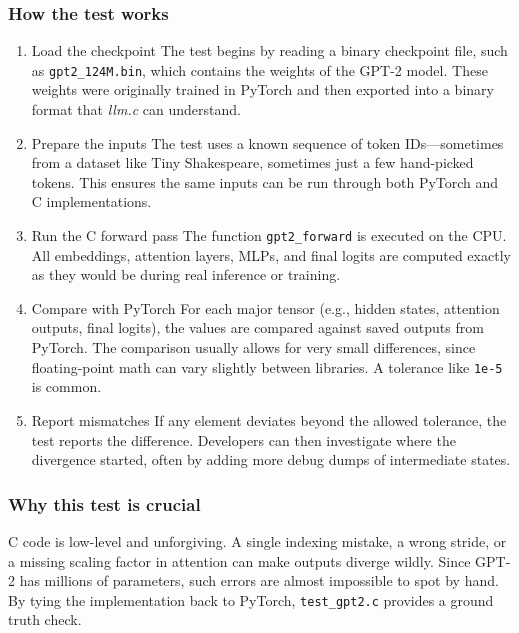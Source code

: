 \documentclass[
  letterpaper,
  DIV=11,
  numbers=noendperiod]{scrreprt}
\begin{document}
\subsubsection{How the test works}\label{how-the-test-works}

\begin{enumerate}
\def\labelenumi{\arabic{enumi}.}
\item
  Load the checkpoint The test begins by reading a binary checkpoint
  file, such as \texttt{gpt2\_124M.bin}, which contains the weights of
  the GPT-2 model. These weights were originally trained in PyTorch and
  then exported into a binary format that \emph{llm.c} can understand.
\item
  Prepare the inputs The test uses a known sequence of token
  IDs---sometimes from a dataset like Tiny Shakespeare, sometimes just a
  few hand-picked tokens. This ensures the same inputs can be run
  through both PyTorch and C implementations.
\item
  Run the C forward pass The function \texttt{gpt2\_forward} is executed
  on the CPU. All embeddings, attention layers, MLPs, and final logits
  are computed exactly as they would be during real inference or
  training.
\item
  Compare with PyTorch For each major tensor (e.g., hidden states,
  attention outputs, final logits), the values are compared against
  saved outputs from PyTorch. The comparison usually allows for very
  small differences, since floating-point math can vary slightly between
  libraries. A tolerance like \texttt{1e-5} is common.
\item
  Report mismatches If any element deviates beyond the allowed
  tolerance, the test reports the difference. Developers can then
  investigate where the divergence started, often by adding more debug
  dumps of intermediate states.
\end{enumerate}

\subsubsection{Why this test is crucial}\label{why-this-test-is-crucial}

C code is low-level and unforgiving. A single indexing mistake, a wrong
stride, or a missing scaling factor in attention can make outputs
diverge wildly. Since GPT-2 has millions of parameters, such errors are
almost impossible to spot by hand. By tying the implementation back to
PyTorch, \texttt{test\_gpt2.c} provides a ground truth check.
\end{document}
